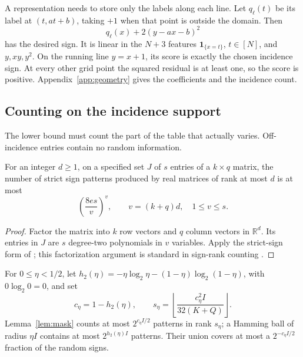 \documentclass[11pt,letterpaper,pmlr,twoside]{jmlr}
\newcommand{\R}{\mathbb R}
\newcommand{\one}{\mathbf 1}
\newcommand{\hbin}{h_2}
\begin{document}
A representation needs to store only the labels along each line. Let $q_\ell(t)$ be its label at $(t,at+b)$, taking $+1$ when that point is outside the domain. Then
\begin{equation}
 q_\ell(x)+2(y-ax-b)^2
 \label{eq:representation-score}
\end{equation}
has the desired sign. It is linear in the $N+3$ features $\one_{\{x=t\}}$, $t\in[N]$, and $y,xy,y^2$. On the running line $y=x+1$, its score is exactly the chosen incidence sign. At every other grid point the squared residual is at least one, so the score is positive. Appendix~\ref{app:geometry} gives the coefficients and the incidence count.

\subsection{Counting on the incidence support}
The lower bound must count the part of the table that actually varies. Off-incidence entries contain no random information.

\begin{lemma}\label{lem:mask}
For an integer $d\ge1$, on a specified set $J$ of $s$ entries of a $k\times q$ matrix, the number of strict sign patterns produced by real matrices of rank at most $d$ is at most
\begin{equation}
 \left(\frac{8es}{v}\right)^v,\qquad v=(k+q)d,\quad 1\le v\le s.
 \label{eq:maskcount}
\end{equation}
\end{lemma}

\begin{proof}
Factor the matrix into $k$ row vectors and $q$ column vectors in $\R^d$. Its entries in $J$ are $s$ degree-two polynomials in $v$ variables. Apply the strict-sign form of \citet{Warren68}; this factorization argument is standard in sign-rank counting \citep{AMY16}.
\end{proof}

For $0\le\eta<1/2$, let $\hbin(\eta)=-\eta\log_2\eta-(1-\eta)\log_2(1-\eta)$, with $0\log_2 0=0$, and set
\begin{equation}
 c_\eta=1-\hbin(\eta),\qquad
 s_\eta=\left\lfloor\frac{c_\eta^2 I}{32(K+Q)}\right\rfloor.
 \label{eq:seta}
\end{equation}
Lemma~\ref{lem:mask} counts at most $2^{c_\eta I/2}$ patterns in rank $s_\eta$; a Hamming ball of radius $\eta I$ contains at most $2^{\hbin(\eta)I}$ patterns. Their union covers at most a $2^{-c_\eta I/2}$ fraction of the random signs.
\end{document}
